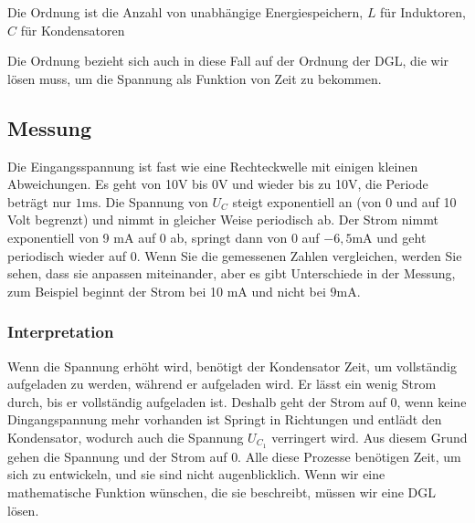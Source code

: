 %
%
Die Ordnung ist die Anzahl von unabhängige Energiespeichern,
$L$ für Induktoren, $C$ für Kondensatoren

Die Ordnung bezieht sich auch in diese Fall auf der Ordnung der DGL, die wir lösen muss, um die Spannung als Funktion von Zeit zu bekommen.




\subsection{Messung}
 Die Eingangsspannung ist fast wie eine Rechteckwelle mit einigen kleinen Abweichungen. Es geht von 10V bis 0V und wieder bis zu 10V, die Periode beträgt nur $1\si{\milli\second}$. Die Spannung von $U_C$ steigt exponentiell an (von 0 und auf 10 Volt begrenzt) und nimmt in gleicher Weise periodisch ab. Der Strom nimmt exponentiell von 9 $\si{\milli\ampere}$ auf 0 ab, springt dann von 0 auf
 $-6,5\si{\milli\ampere}$ und geht periodisch wieder auf 0. Wenn Sie die gemessenen Zahlen vergleichen, werden Sie sehen, dass sie anpassen miteinander, aber es gibt Unterschiede in der Messung, zum Beispiel beginnt der Strom bei 10 $\si{\milli\ampere}$ und nicht bei $9 \si{\milli\ampere}$.

\subsubsection{Interpretation}

Wenn die Spannung erhöht wird, benötigt der Kondensator Zeit, um vollständig aufgeladen zu werden, während er aufgeladen wird. Er lässt ein wenig Strom durch, bis er vollständig aufgeladen ist. Deshalb geht der Strom auf 0, wenn keine Dingangspannung mehr vorhanden ist Springt in Richtungen und entlädt den Kondensator, wodurch auch die Spannung $U_{C_1}$ verringert wird. Aus diesem Grund gehen die Spannung und der Strom auf 0. Alle diese Prozesse benötigen Zeit, um sich zu entwickeln, und sie sind nicht augenblicklich. Wenn wir eine mathematische Funktion wünschen, die sie beschreibt, müssen wir eine DGL lösen.

